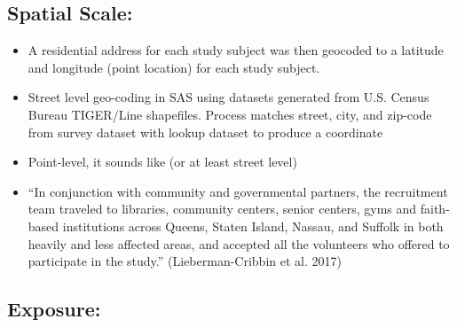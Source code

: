 \documentclass[
]{article}
\providecommand{\tightlist}{%
  \setlength{\itemsep}{0pt}\setlength{\parskip}{0pt}}
\begin{document}
\hypertarget{spatial-scale-3}{%
\subsection{Spatial Scale:}\label{spatial-scale-3}}

\begin{itemize}
\tightlist
\item
  A residential address for each study subject was then geocoded to a
  latitude and longitude (point location) for each study subject.
\item
  Street level geo-coding in SAS using datasets generated from U.S.
  Census Bureau TIGER/Line shapefiles. Process matches street, city, and
  zip-code from survey dataset with lookup dataset to produce a
  coordinate
\item
  Point-level, it sounds like (or at least street level)
\item
  ``In conjunction with community and governmental partners, the
  recruitment team traveled to libraries, community centers, senior
  centers, gyms and faith-based institutions across Queens, Staten
  Island, Nassau, and Suffolk in both heavily and less affected areas,
  and accepted all the volunteers who offered to participate in the
  study.'' (Lieberman-Cribbin et al. 2017)
\end{itemize}

\hypertarget{exposure-3}{%
\subsection{Exposure:}\label{exposure-3}}
\end{document}
